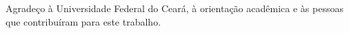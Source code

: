 Agradeço à Universidade Federal do Ceará, à orientação acadêmica e às pessoas que contribuíram para este trabalho.

